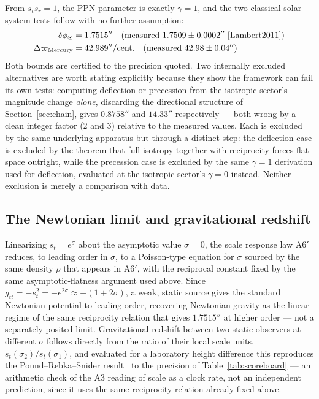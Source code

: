 \documentclass[aps,prd,twocolumn,superscriptaddress,nofootinbib]{revtex4-2}
\begin{document}
From $s_t s_r=1$, the PPN parameter is exactly $\gamma=1$, and the two
classical solar-system tests follow with no further assumption:
\begin{align}
\delta\phi_\odot &= 1.7515'' \quad(\text{measured } 1.7509\pm0.0002''\text{~\cite{Lambert2011}})\\
\Delta\varpi_{\text{Mercury}} &= 42.989''/\text{cent.}\quad(\text{measured } 42.98\pm0.04'')
\end{align}
Both bounds are certified to the precision quoted. Two internally
excluded alternatives are worth stating explicitly because they show the
framework can fail its own tests: computing deflection or precession
from the isotropic sector's magnitude change \emph{alone}, discarding the
directional structure of Section~\ref{sec:chain}, gives $0.8758''$ and
$14.33''$ respectively — both wrong by a clean integer factor (2 and 3)
relative to the measured values. Each is excluded by the same underlying
apparatus but through a distinct step: the deflection case is excluded
by the theorem that full isotropy together with reciprocity forces flat
space outright, while the precession case is excluded by the same
$\gamma=1$ derivation used for deflection, evaluated at the isotropic
sector's $\gamma=0$ instead. Neither exclusion is merely a comparison
with data.

\subsection{The Newtonian limit and gravitational redshift}

Linearizing $s_t = e^{\sigma}$ about the asymptotic value $\sigma=0$, the
scale response law A6$'$ reduces, to leading order in $\sigma$, to a
Poisson-type equation for $\sigma$ sourced by the same density $\rho$ that
appears in A6$'$, with the reciprocal constant fixed by the same
asymptotic-flatness argument used above. Since
$g_{tt}=-s_t^2=-e^{2\sigma}\approx -(1+2\sigma)$, a weak, static source
gives the standard Newtonian potential to leading order, recovering
Newtonian gravity as the linear regime of the same reciprocity relation
that gives $1.7515''$ at higher order — not a separately posited limit.
Gravitational redshift between two static observers at different $\sigma$
follows directly from the ratio of their local scale units,
$s_t(\sigma_2)/s_t(\sigma_1)$, and evaluated for a laboratory height
difference this reproduces the Pound--Rebka--Snider
result~\cite{PoundRebka1960,PoundSnider1965} to the precision of
Table~\ref{tab:scoreboard} — an arithmetic check of the A3 reading of
scale as a clock rate, not an independent prediction, since it uses the
same reciprocity relation already fixed above.
\end{document}
